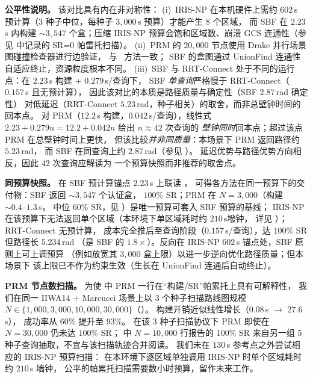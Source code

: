 \documentclass[journal]{IEEEtran}
\begin{document}
\textbf{公平性说明。}
该对比具有内在非对称性：
(i)~IRIS-NP 在本机硬件上需约 $602$\,s 预计算（3 种子中位，每种子 $3{,}000$\,s 预算）才能产生 $8$ 个区域，
    而 SBF 在 $2.23$\,s 内构建 ${\sim}3{,}547$ 个盒；压缩 IRIS-NP 预算会饱和区域数、崩溃 GCS 连通性（参见  中记录的 SR=0 帕雷托扫描）。
(ii)~PRM 的 $20{,}000$ 节点使用 Drake 并行场景图碰撞检查器进行边验证，
    与~\cite{marcucci2024motion} 方法一致；
    SBF 的盒图通过 UnionFind 连通性自适应终止，资源粒度根本不同。
(iii)~SBF 与 RRT-Connect 处于不同的运行点：在 $2.23$\,s 构建 + $0.279$\,s/查询下，
    SBF \emph{单查询}严格慢于 RRT-Connect（$0.157$\,s 且无预计算），
    因此该对比的本质是路径质量与确定性（SBF $2.87$\,rad 确定性）
    对低延迟（RRT-Connect $5.23$\,rad，种子相关）的取舍，而非总壁钟时间的回本点。
    对 PRM（$12.2$\,s 构建，$0.042$\,s/查询），线性式
    $2.23 + 0.279n = 12.2 + 0.042n$ 给出 $n\!\approx\!42$ 次查询的
    \emph{壁钟同时}回本点；超过该点 PRM 在总壁钟时间上更快，
    但该比较\emph{并非同质量}：本场景下 PRM 返回路径约 $5.23$\,rad，
    而 SBF 在同查询上约 $2.87$\,rad（参见 ）。
    延迟优势与路径优势方向相反，因此 $42$ 次查询应解读为
    一个预算快照而非推荐的取舍点。

\textbf{同预算快照。}
在 SBF 预计算锚点 $2.23$\,s 上联读 ，
可得各方法在同一预算下的交付物：SBF 返回 ${\sim}3{,}547$ 个认证盒，
$100\%$ SR；PRM 在 $N{=}3{,}000$（构建 ${\sim}0.4\text{--}1.3$\,s，
中位 $60\%$ SR，见 ）是唯一预算可套入 SBF 预算的基线；
IRIS-NP 在该预算下无法返回单个区域（本环境下单区域耗时约 $210$\,s墢钟，
详见 ）；RRT-Connect 无预计算，
成本完全推后至查询阶段（$0.157$\,s/查询），达 $100\%$ SR 但路径长 $5.234$\,rad
（是 SBF 的 $1.8\times$）。反向在 IRIS-NP $602$\,s 锚点处，SBF 原则上可上调预算
（例如放宽其 $3{,}000$ 盒上限）以进一步逆向优化路径质量；但本场景下
该上限已不作为约束生效（生长在 UnionFind 连通后自动终止）。

\textbf{PRM 节点数扫描。}
为使  中 PRM 一行在“构建/SR”帕累托上具有可解释性，
我们在同一 IIWA14 + Marcucci 场景上以 3 个种子扫描路线图规模
$N \in \{1{,}000, 3{,}000, 10{,}000, 30{,}000\}$（）。
构建开销近似线性增长（$0.08$\,s $\to$ $27.6$\,s），
成功率从 $60\%$ 提升至 $93\%$。
在该 3 种子扫描协议下 PRM 即使在 $N{=}30{,}000$ 仍未达 $100\%$ SR；
 中 $N{=}10{,}000$ 行报告的 $100\%$ SR 来自另一组 5 种子查询抽取，不宜与该扫描轨迹合并阅读。
我们未在 $130$\,s 参考点之外尝试相应的 IRIS-NP 预算扫描：
在本环境下逐区域单独调用 IRIS-NP 时单个区域耗时约 $210$\,s 墙钟，
公平的帕累托扫描需要数小时预算，留作未来工作。
\end{document}
